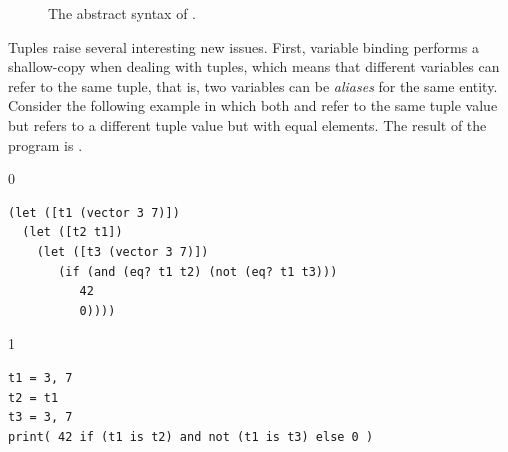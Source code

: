 \documentclass[7x10,nocrop]{TimesAPriori_MIT}%
\newcommand{\gray}[1]{{\color{gray} #1}}
\def\racketEd{0}
\def\pythonEd{1}
\def\edition{0}
\begin{document}
\begin{figure}[tp]
\centering
\fbox{
\begin{minipage}{0.96\textwidth}
{\if\edition\racketEd    
\[
\begin{array}{l}
  \gray{\LintOpAST} \\ \hline
  \gray{\LvarASTRacket{}} \\ \hline
  \gray{\LifASTRacket{}} \\ \hline
  \gray{\LwhileASTRacket{}} \\ \hline
  \LtupASTRacket{} \\
\begin{array}{lcl}
  \LangVecM{} &::=& \PROGRAM{\key{'()}}{\Exp}
\end{array}
\end{array}
\]
\fi}
{\if\edition\pythonEd
\[
\begin{array}{l}
  \gray{\LintASTPython} \\ \hline
  \gray{\LvarASTPython} \\ \hline
  \gray{\LifASTPython} \\ \hline
  \gray{\LwhileASTPython} \\ \hline
  \LtupASTPython \\
  \begin{array}{lcl}
    \LangLoopM{} &::=& \PROGRAM{\code{'()}}{\Stmt^{*}}
  \end{array}
\end{array}
\]
\fi}
\end{minipage}
}
\caption{The abstract syntax of \LangVec{}.}
\label{fig:Lvec-syntax}
\end{figure}

Tuples raise several interesting new issues.  First, variable binding
performs a shallow-copy when dealing with tuples, which means that
different variables can refer to the same tuple, that is, two
variables can be \emph{aliases} for the same
entity. Consider the following example in which both  and
 refer to the same tuple value but  refers to a
different tuple value but with equal elements. The result of the
program is .


\begin{center}
\begin{minipage}{0.96\textwidth}
{\if\edition\racketEd        
\begin{lstlisting}
(let ([t1 (vector 3 7)])
  (let ([t2 t1])
    (let ([t3 (vector 3 7)])
       (if (and (eq? t1 t2) (not (eq? t1 t3)))
          42
          0))))
\end{lstlisting}
\fi}
{\if\edition\pythonEd
\begin{lstlisting}
t1 = 3, 7
t2 = t1
t3 = 3, 7
print( 42 if (t1 is t2) and not (t1 is t3) else 0 )
\end{lstlisting}
\fi}
\end{minipage}
\end{center}
\end{document}
